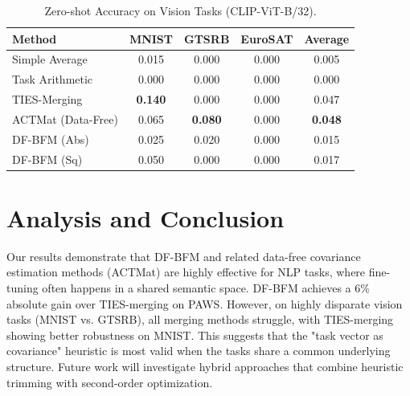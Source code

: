 \documentclass{article}
\begin{document}
\begin{table}[h]
\caption{Zero-shot Accuracy on Vision Tasks (CLIP-ViT-B/32).}
\label{vision-results-table}
\begin{center}
\begin{tabular}{lcccc}
\toprule
\bf Method & \bf MNIST & \bf GTSRB & \bf EuroSAT & \bf Average \\
\midrule
Simple Average   & 0.015 & 0.000 & 0.000 & 0.005 \\
Task Arithmetic  & 0.000 & 0.000 & 0.000 & 0.000 \\
TIES-Merging     & \bf 0.140 & 0.000 & 0.000 & 0.047 \\
ACTMat (Data-Free) & 0.065 & \bf 0.080 & 0.000 & \bf 0.048 \\
DF-BFM (Abs)     & 0.025 & 0.020 & 0.000 & 0.015 \\
DF-BFM (Sq)      & 0.050 & 0.000 & 0.000 & 0.017 \\
\bottomrule
\end{tabular}
\end{center}
\end{table}

\section{Analysis and Conclusion}

Our results demonstrate that DF-BFM and related data-free covariance estimation methods (ACTMat) are highly effective for NLP tasks, where fine-tuning often happens in a shared semantic space. DF-BFM achieves a 6\% absolute gain over TIES-merging on PAWS. However, on highly disparate vision tasks (MNIST vs. GTSRB), all merging methods struggle, with TIES-merging showing better robustness on MNIST. This suggests that the "task vector as covariance" heuristic is most valid when the tasks share a common underlying structure. Future work will investigate hybrid approaches that combine heuristic trimming with second-order optimization.



\end{document}
